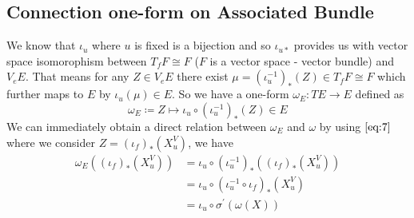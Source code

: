 \documentclass[12pt]{article}
\begin{document}
\subsection{Connection one-form on Associated Bundle}
We know that $\iota_{u}$ where $u$ is fixed is a bijection and so $\iota_{u\ast}$  provides us with vector space isomorophism between $T_{f}F\cong F$ ($F$ is a vector space - vector bundle) and $V_{e}E$. That means for any $Z\in V_{e}E$ there exist $\mu = (\iota^{-1}_{u})_{\ast}(Z)\in T_{f}F\cong F$ which further maps to $E$ by $\iota_{u}(\mu)\in E$. So we have a one-form $\omega_{E}\colon TE\to E$ defined as
\begin{equation*}
    \omega_{E}\coloneqq Z\mapsto \iota_{u}\circ(\iota^{-1}_{u})_{\ast}(Z)\in E
\end{equation*} We can immediately obtain a direct relation between $\omega_{E}$ and $\omega$ by using $\ref{eq:7}$ where we consider $Z = (\iota_{f})_{\ast}(X^{V}_{u})$, we have
\begin{align*}
    \omega_{E}((\iota_{f})_{\ast}(X^{V}_{u})) &= \iota_{u}\circ(\iota^{-1}_{u})_{\ast}((\iota_{f})_{\ast}(X^{V}_{u})) \\
                                            &= \iota_{u}\circ(\iota^{-1}_{u}\circ\iota_{f})_{\ast}(X^{V}_{u}) \\
                                            &= \iota_{u}\circ\sigma^{\prime}(\omega(X))
\end{align*}
\end{document}
